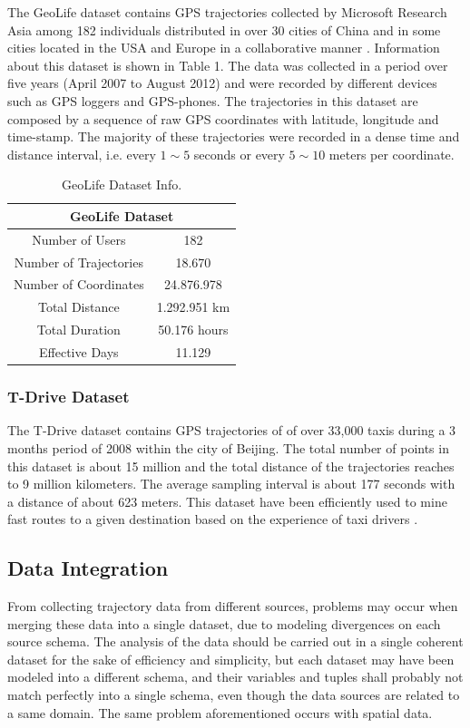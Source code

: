 \documentclass[a4paper,12pt]{article}
\begin{document}
The GeoLife dataset contains GPS trajectories collected by Microsoft Research Asia among 182 individuals distributed in over 30 cities of China and in some cities located in the USA and Europe in a collaborative manner \cite{geolifeuserguide}. Information about this dataset is shown in Table 1. The data was collected in a period over five years (April 2007 to August 2012) and were recorded by different devices such as GPS loggers and GPS-phones. The trajectories in this dataset are composed by a sequence of raw GPS coordinates with latitude, longitude and time-stamp. The majority of these trajectories were recorded in a dense time and distance interval, i.e. every $1\sim5$ seconds or every $5\sim10$ meters per coordinate.
	
\begin{table}[htbp]
\centering
\label{tab:geolife}
\begin{tabular}{cc}
\toprule
\multicolumn{2}{c}{GeoLife Dataset}\\
\midrule
Number of Users	& 182\\
Number of Trajectories & 18.670\\
Number of Coordinates & 24.876.978\\
Total Distance & 1.292.951 km\\
Total Duration & 50.176 hours\\
Effective Days & 11.129\\
\bottomrule
\end{tabular}
\caption{GeoLife Dataset Info.}
\end{table}
	
\subsubsection{T-Drive Dataset}\label{sec:tdrive}
The T-Drive dataset contains GPS trajectories of of over 33,000 taxis during a 3 months period of 2008 within the city of Beijing. The total number of points in this dataset is about 15 million and the total distance of the trajectories reaches to 9 million kilometers. The average sampling interval is about 177 seconds with a distance of about 623 meters. This dataset have been efficiently used to mine fast routes to a given destination based on the experience of taxi drivers \cite{yuan2011}\cite{yuan2010}.

\subsection{Data Integration}\label{sec:integration}
From collecting trajectory data from different sources, problems may occur when merging these data into a single dataset, due to modeling divergences on each source schema. The analysis of the data should be carried out in a single coherent dataset for the sake of efficiency and simplicity, but each dataset may have been modeled into a different schema, and their variables and tuples shall probably not match perfectly into a single schema, even though the data sources are related to a same domain. The same problem aforementioned occurs with spatial data.
\end{document}
